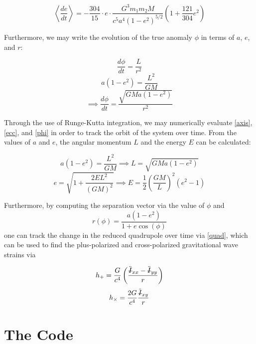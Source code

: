 \documentclass[preprint2]{aastex}
\newcommand{\Ibar}{\mbox{\st{$I$}}}
\begin{document}
\begin{equation} \label{ecc}
\left< \frac{de}{dt} \right> = - \frac{304}{15} \cdot e \cdot \frac{G^3 m_1 m_2 M}{c^5 a^4 (1 - e^2)^{5/2}} \left( 1 + \frac{121}{304}e^2 \right)
\end{equation}

Furthermore, we may write the evolution of the true anomaly \(\phi\) in terms of \(a\), \(e\), and \(r\):

\[
 \frac{d \phi}{dt} = \frac{L}{r^2}
\]
\[
a(1 - e^2) = \frac{L^2}{GM}
\]
\begin{equation} \label{phi}
\implies \frac{d \phi}{dt} = \frac{\sqrt{GMa(1 - e^2)}}{r^2}
\end{equation}

Through the use of Runge-Kutta integration, we may numerically evaluate \eqref{axis}, \eqref{ecc}, and \eqref{phi} in order to track the orbit of the system over time. From the values of \(a\) and \(e\), the angular momentum \(L\) and the energy \(E\) can be calculated:

\begin{equation} \label{momentum}
a(1 - e^2) = \frac{L^2}{GM} \implies L = \sqrt{GMa(1 - e^2)}
\end{equation}
\begin{equation} \label{energy}
e = \sqrt{1 + \frac{2EL^2}{(GM)^2}} \implies E = \frac{1}{2} \left( \frac{G M}{L} \right)^2 (e^2 - 1)
\end{equation}

Furthermore, by computing the separation vector via the value of \(\phi\) and
\begin{equation} \label{r}
r(\phi) = \frac{a(1-e^2)}{1 + e \cos(\phi)}
\end{equation}
one can track the change in the reduced quadrupole over time via \eqref{quad}, which can be used to find the plus-polarized and cross-polarized gravitational wave strains via

\begin{equation} \label{hplus}
h_+ = \frac{G}{c^4} \left( \frac{\ddot{\Ibar}_{xx} - \ddot{\Ibar}_{yy}}{r} \right)
\end{equation}
\begin{equation} \label{hcross}
 h_{\times} = \frac{2G}{c^4} \frac{\ddot{\Ibar}_{xy}}{r}
\end{equation}

\section{The Code}
\end{document}
